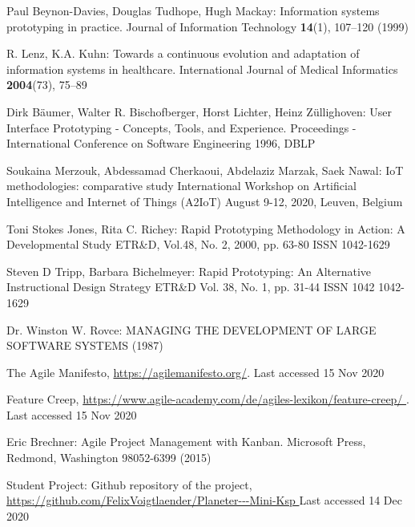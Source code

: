 \documentclass[runningheads]{llncs}
\begin{document}
%
%
%
% 
% 
%
\begin{thebibliography}{8}

Paul Beynon-Davies, Douglas Tudhope, Hugh Mackay: Information systems prototyping in practice. 
Journal of Information Technology  \textbf{14}(1), 107--120 (1999) 

R. Lenz, K.A. Kuhn: Towards a continuous evolution and adaptation of
information systems in healthcare. 
International Journal of Medical Informatics   \textbf{2004}(73), 75--89

Dirk Bäumer, Walter R. Bischofberger, Horst Lichter, Heinz Züllighoven: User Interface Prototyping - Concepts, Tools, and Experience.
Proceedings - International Conference on Software Engineering 1996, DBLP 

Soukaina Merzouk, Abdessamad Cherkaoui, Abdelaziz Marzak, Saek Nawal: IoT methodologies: comparative study
International Workshop on Artificial Intelligence and Internet of Things (A2IoT) August 9-12, 2020, Leuven, Belgium

Toni Stokes Jones, Rita C. Richey: Rapid Prototyping Methodology in Action: A Developmental Study
ETR\&D, Vol.48, No. 2, 2000, pp. 63-80 ISSN 1042-1629 

Steven D Tripp, Barbara Bichelmeyer: Rapid Prototyping: An Alternative Instructional Design Strategy
ETR\&D Vol. 38, No. 1, pp. 31-44 ISSN 1042 1042-1629

Dr. Winston W. Rovce: MANAGING THE DEVELOPMENT OF LARGE SOFTWARE SYSTEMS (1987)

The Agile Manifesto, \url{https://agilemanifesto.org/}. Last accessed 15
Nov 2020

Feature Creep, \url{https://www.agile-academy.com/de/agiles-lexikon/feature-creep/
}. Last accessed 15
Nov 2020

Eric Brechner: Agile Project Management with Kanban. Microsoft Press,
Redmond, Washington 98052-6399 (2015)

Student Project: Github repository of the project, \url{https://github.com/FelixVoigtlaender/Planeter---Mini-Ksp
} Last accessed 14
Dec 2020


\end{thebibliography}
\end{document}
